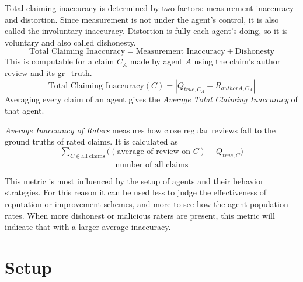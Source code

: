 \documentclass[%
    ]{\PathToTumTemplate/thesis/tum_thesis}
\begin{document}
Total claiming inaccuracy is determined by two factors: measurement inaccuracy and distortion.
Since measurement is not under the agent's control, it is also called the involuntary inaccuracy.
Distortion is fully each agent's doing, so it is voluntary and also called dishonesty.
\begin{equation}
\text{Total Claiming Inaccuracy} = \text{Measurement Inaccuracy} + \text{Dishonesty}
\end{equation}
This is computable for a claim $C_A$ made by agent $A$ using the claim's author review and its \gls{gr_truth}.
\begin{equation}
\text{Total Claiming Inaccuracy}(C) = \left| Q_{true,C_{A}} - R_{authorA,C_{A}} \right|
\end{equation}
Averaging every claim of an agent gives the \emph{Average Total Claiming Inaccuracy} of that agent.

\vspace{6pt}

\emph{Average Inaccuracy of Raters} measures how close regular reviews fall to the ground truths of rated claims.
It is calculated as
\begin{equation}
\frac{\sum_{C\in\text{all claims}}({(\text{average of review on }C) - Q_{true,C})}}{\text{number of all claims}}
\end{equation}

This metric is most influenced by the setup of agents and their behavior strategies.
For this reason it can be used less to judge the effectiveness of reputation or improvement schemes, and more to see how the agent population rates.
When more dishonest or malicious raters are present, this metric will indicate that with a larger average inaccuracy.



\section{Setup}\label{sec:setup}
\end{document}
